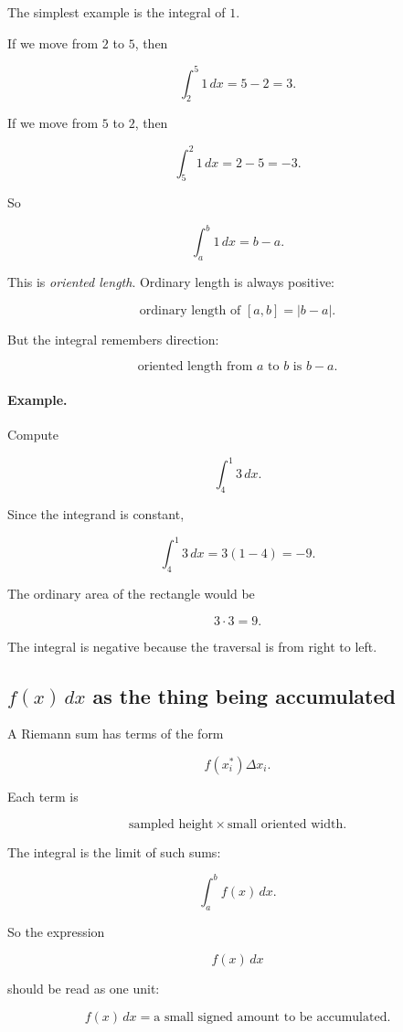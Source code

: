 The simplest example is the integral of \(1\).

If we move from \(2\) to \(5\), then

\[
\int_2^5 1\,dx=5-2=3.
\]

If we move from \(5\) to \(2\), then

\[
\int_5^2 1\,dx=2-5=-3.
\]

So

\[
\int_a^b 1\,dx=b-a.
\]

This is \emph{oriented length}.  Ordinary length is always positive:

\[
\text{ordinary length of }[a,b]=|b-a|.
\]

But the integral remembers direction:

\[
\boxed{
\text{oriented length from \(a\) to \(b\) is }b-a.
}
\]

\paragraph{Example.}
Compute

\[
\int_4^1 3\,dx.
\]

Since the integrand is constant,

\[
\int_4^1 3\,dx=3(1-4)=-9.
\]

The ordinary area of the rectangle would be

\[
3\cdot3=9.
\]

The integral is negative because the traversal is from right to left.

\subsection{\texorpdfstring{\(f(x)\,dx\)}{f(x) dx} as the thing being accumulated}
\label{subsec:integrand-being-accumulated}

A Riemann sum has terms of the form

\[
f(x_i^*)\Delta x_i.
\]

Each term is

\[
\text{sampled height}\times\text{small oriented width}.
\]

The integral is the limit of such sums:

\[
\int_a^b f(x)\,dx.
\]

So the expression

\[
f(x)\,dx
\]

should be read as one unit:

\[
\boxed{
f(x)\,dx=\text{a small signed amount to be accumulated.}
}
\]

